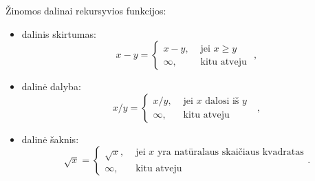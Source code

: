 \begin{note}
  Žinomos dalinai rekursyvios funkcijos:
  \begin{itemize}
    \item dalinis skirtumas:
      \[
      x - y =%
      \begin{cases}
        x - y, & \text{ jei } x \geq y \\
        \infty, & \text{ kitu atveju }
      \end{cases},
      \]
    \item dalinė dalyba:
      \[
      x / y =%
      \begin{cases}
        x / y, & \text{ jei $x$ dalosi iš $y$ }\\
        \infty, & \text{ kitu atveju }
      \end{cases},
      \]
    \item dalinė šaknis:
      \[
      \sqrt{x} =%
      \begin{cases}
        \sqrt{x}, & \text{ jei $x$ yra natūralaus skaičiaus kvadratas} \\
        \infty, & \text{ kitu atveju }
      \end{cases}.
      \]
  \end{itemize}
\end{note}

